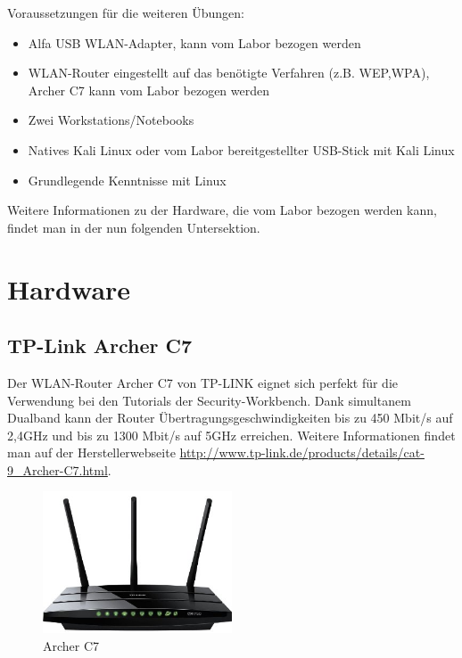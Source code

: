 Voraussetzungen für die weiteren Übungen:

\begin{itemize}
	\item Alfa USB WLAN-Adapter, kann vom Labor bezogen werden
	\item WLAN-Router eingestellt auf das benötigte Verfahren (z.B. WEP,WPA), Archer C7 kann vom Labor bezogen werden
	\item Zwei Workstations/Notebooks
	\item Natives Kali Linux oder vom Labor bereitgestellter USB-Stick mit Kali Linux
	\item Grundlegende Kenntnisse mit Linux
\end{itemize}
Weitere Informationen zu der Hardware, die vom Labor bezogen werden kann, findet man in der nun folgenden Untersektion.

\section{Hardware}

\subsection{TP-Link Archer C7}
 Der WLAN-Router Archer C7 von TP-LINK eignet sich perfekt für die Verwendung bei den Tutorials der Security-Workbench. Dank simultanem Dualband kann der Router Übertragungsgeschwindigkeiten bis zu 450 Mbit/s auf 2,4GHz und bis zu 1300 Mbit/s auf 5GHz erreichen. Weitere Informationen findet man auf der Herstellerwebseite \url{http://www.tp-link.de/products/details/cat-9_Archer-C7.html}.

\begin{figure}[H]
	\centering
	\includegraphics[width=0.5\textwidth]{images/WLAN/ArcherC7.jpg}
	\caption{Archer C7}
	\label{fig:Archer C7}
\end{figure}

